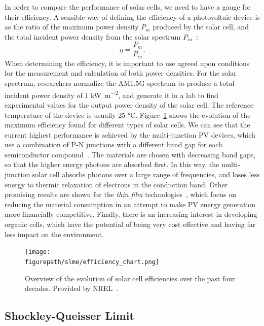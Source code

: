 \begin{refsection}
In order to compare the performance of solar cells, we need to have a gauge 
for their efficiency. A sensible way of defining the efficiency of a 
photovoltaic device is as the ratio of the maximum power density $P_m$ 
produced by the solar cell, and the total incident power density from the 
solar spectrum $P_{in}$~\cite{Fonash2010}: 
\begin{equation} 
\eta = \frac{P_m}{P_{in}}. 
\end{equation} 
When determining the efficiency, it is important to use agreed upon conditions 
for the measurement and calculation of both power densities. For the solar spectrum, 
researchers normalize the AM1.5G spectrum to produce a total incident power 
density of 1 \si{\kilo\watt \per \meter\squared}, and generate it in a lab to find 
experimental values for the output power density of the solar cell. The 
reference temperature of the device is usually 25 \si{\celsius}. 
Figure~\ref{slme:fig-effchart} shows the evolution of the maximum efficiency 
found for different types of solar cells. We can see that the current highest 
performance is achieved by the multi-junction PV devices, which use a 
combination of P-N junctions with a different band gap for each semiconductor 
compound~\cite{Dimroth2007}. The materials are chosen with decreasing band 
gaps, so that the higher energy photons are absorbed first. In this way, the 
multi-junction solar cell absorbs photons over a large range of frequencies, 
and loses less energy to thermic relaxation of electrons in the conduction 
band. Other promising results are shown for the \textit{thin film} 
technologies~\cite{Shah2004}, which focus on reducing the material consumption 
in an attempt to make PV energy generation more financially competitive. 
Finally, there is an increasing interest in developing organic cells, which 
have the potential of being very cost effective and having far less impact on 
the environment. 
 
\begin{figure}[ht]  
\centering 
\texttt{[image: \\figurepath/slme/efficiency\_chart.png]} 
\caption{\label{slme:fig-effchart} Overview of the evolution of solar cell 
efficiencies over the past four decades. Provided by NREL~\cite{NREL2019}.} 
\end{figure} 
 
\subsection{Shockley-Queisser Limit} \label{slme:sec-SQlimit} 
 

\end{refsection}
